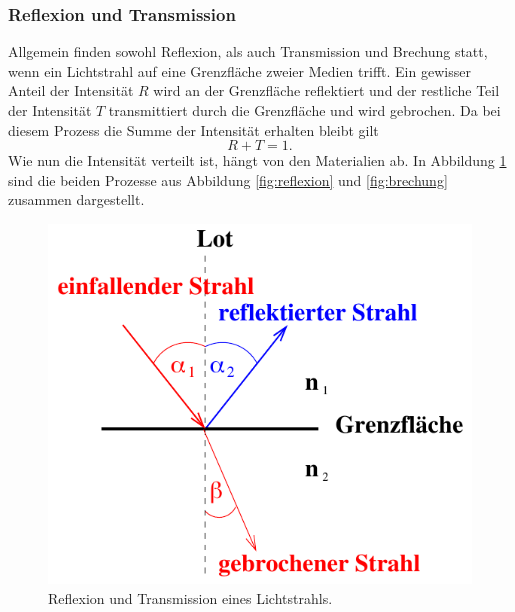 \subsubsection*{Reflexion und Transmission}
\label{sec:RefTrans}
Allgemein finden sowohl Reflexion, als auch Transmission und Brechung statt, wenn ein Lichtstrahl auf eine Grenzfläche zweier
Medien trifft. Ein gewisser Anteil der Intensität $R$ wird an der Grenzfläche reflektiert und der restliche
Teil der Intensität $T$ transmittiert durch die Grenzfläche und wird gebrochen. Da bei diesem Prozess die
Summe der Intensität erhalten bleibt gilt
\begin{equation}
    R+T=1.
\end{equation}
Wie nun die Intensität verteilt ist, hängt von den Materialien ab. In Abbildung \ref{fig:RefTrans}
sind die beiden Prozesse aus Abbildung \ref{fig:reflexion} und \ref{fig:brechung} zusammen dargestellt.
\begin{figure}[H]
    \centering
    \includegraphics[scale = 0.5]{pictures/ReflexionTransmission.png}
    \caption{Reflexion und Transmission eines Lichtstrahls. \cite{AP01}}
    \label{fig:RefTrans}
\end{figure}

